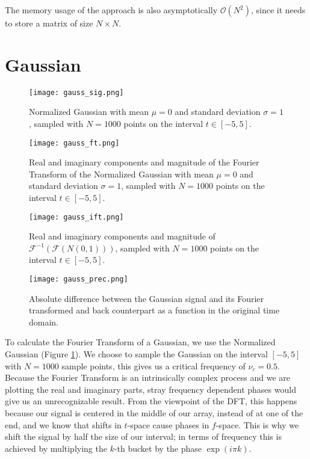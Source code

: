\documentclass[10pt,a4paper,twocolumn]{article}
\begin{document}
The memory usage of the approach is also asymptotically $\mathcal{O} \left( N^2 \right)$, since it needs to store a matrix of size $N \times N$.


\section{Gaussian}\label{sec:gaussian}

\begin{figure}
\centering
\captionsetup{justification=centering}
\texttt{[image: gauss\_sig.png]}
\caption{Normalized Gaussian with mean $\mu=0$ and standard deviation $\sigma=1$, sampled with $N=1000$ points on the interval $t \in [-5,5]$.}
\label{fig:gauss_sig}
\end{figure}

\begin{figure}
\centering
\captionsetup{justification=centering}
\texttt{[image: gauss\_ft.png]}
\caption{Real and imaginary components and magnitude of the Fourier Transform of the Normalized Gaussian with mean $\mu=0$ and standard deviation $\sigma=1$, sampled with $N=1000$ points on the interval $t \in [-5,5]$.}
\label{fig:gauss_ft}
\end{figure}

\begin{figure}
\centering
\captionsetup{justification=centering}
\texttt{[image: gauss\_ift.png]}
\caption{Real and imaginary components and magnitude of $\mathcal{F}^{-1} \left( \mathcal{F} \left( N(0, 1) \right) \right)$, sampled with $N=1000$ points on the interval $t \in [-5,5]$.}
\label{fig:gauss_ift}
\end{figure}

\begin{figure}
\centering
\captionsetup{justification=centering}
\texttt{[image: gauss\_prec.png]}
\caption{Absolute difference between the Gaussian signal and its Fourier transformed and back counterpart as a function in the original time domain.}
\label{fig:gauss_prec}
\end{figure}

To calculate the Fourier Transform of a Gaussian, we use the Normalized Gaussian (Figure \ref{fig:gauss_sig}). We choose to sample the Gaussian on the interval $[-5,5]$ with $N=1000$ sample points, this gives us a critical frequency of $\nu_c = 0.5$. Because the Fourier Transform is an intrinsically complex process and we are plotting the real and imaginary parts, stray frequency dependent phases would give us an unrecognizable result. From the viewpoint of the DFT, this happens because our signal is centered in the middle of our array, instead of at one of the end, and we know that shifts in $t$-space cause phases in $f$-space. This is why we shift the signal by half the size of our interval; in terms of frequency this is achieved by multiplying the $k$-th bucket by the phase $\exp(i \pi k)$. \cite{magajna}
\end{document}
